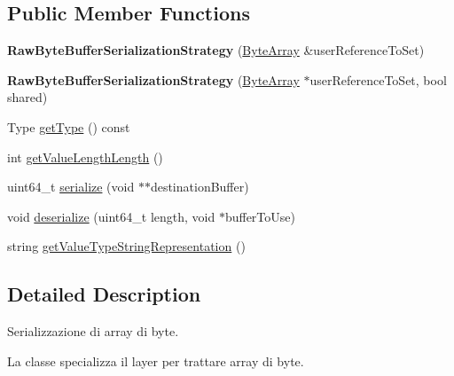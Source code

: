 \subsection*{Public Member Functions}
\begin{DoxyCompactItemize}
\item 
\hypertarget{class_raw_byte_buffer_serialization_strategy_ae459329f56f3e9ce51eec63aa3a01f23}{
{\bfseries RawByteBufferSerializationStrategy} (\hyperlink{class_byte_array}{ByteArray} \&userReferenceToSet)}
\label{class_raw_byte_buffer_serialization_strategy_ae459329f56f3e9ce51eec63aa3a01f23}

\item 
\hypertarget{class_raw_byte_buffer_serialization_strategy_aa44e40ca41e275aa99de5c2bda656436}{
{\bfseries RawByteBufferSerializationStrategy} (\hyperlink{class_byte_array}{ByteArray} $\ast$userReferenceToSet, bool shared)}
\label{class_raw_byte_buffer_serialization_strategy_aa44e40ca41e275aa99de5c2bda656436}

\item 
Type \hyperlink{class_raw_byte_buffer_serialization_strategy_aaf19cb582054a6c17b492f69732c6c0c}{getType} () const 
\item 
int \hyperlink{class_raw_byte_buffer_serialization_strategy_a5193462279c9408946b1b0ce8af503cd}{getValueLengthLength} ()
\item 
uint64\_\-t \hyperlink{class_raw_byte_buffer_serialization_strategy_a84d4f5c8e6f6c1c209760826429a1935}{serialize} (void $\ast$$\ast$destinationBuffer)
\item 
void \hyperlink{class_raw_byte_buffer_serialization_strategy_a67ee1121c936b2df0d68d8ff39f5ac00}{deserialize} (uint64\_\-t length, void $\ast$bufferToUse)
\item 
string \hyperlink{class_raw_byte_buffer_serialization_strategy_a1dd7c0237ad5b9caef4daa9166308376}{getValueTypeStringRepresentation} ()
\end{DoxyCompactItemize}


\subsection{Detailed Description}
Serializzazione di array di byte. 

La classe specializza il layer per trattare array di byte. 

